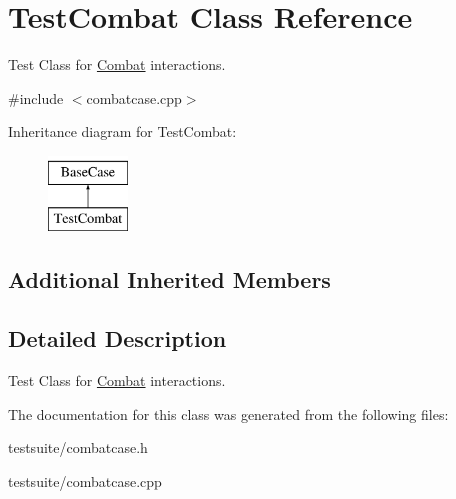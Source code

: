 \hypertarget{classTestCombat}{}\section{Test\+Combat Class Reference}
\label{classTestCombat}


Test Class for \mbox{\hyperlink{classCombat}{Combat}} interactions.  




{\ttfamily \#include $<$combatcase.\+cpp$>$}

Inheritance diagram for Test\+Combat\+:\begin{figure}[H]
\begin{center}
\leavevmode
\includegraphics[height=2.000000cm]{classTestCombat}
\end{center}
\end{figure}
\subsection*{Additional Inherited Members}


\subsection{Detailed Description}
Test Class for \mbox{\hyperlink{classCombat}{Combat}} interactions. 

The documentation for this class was generated from the following files\+:\begin{DoxyCompactItemize}
\item 
testsuite/combatcase.\+h\item 
testsuite/combatcase.\+cpp\end{DoxyCompactItemize}
